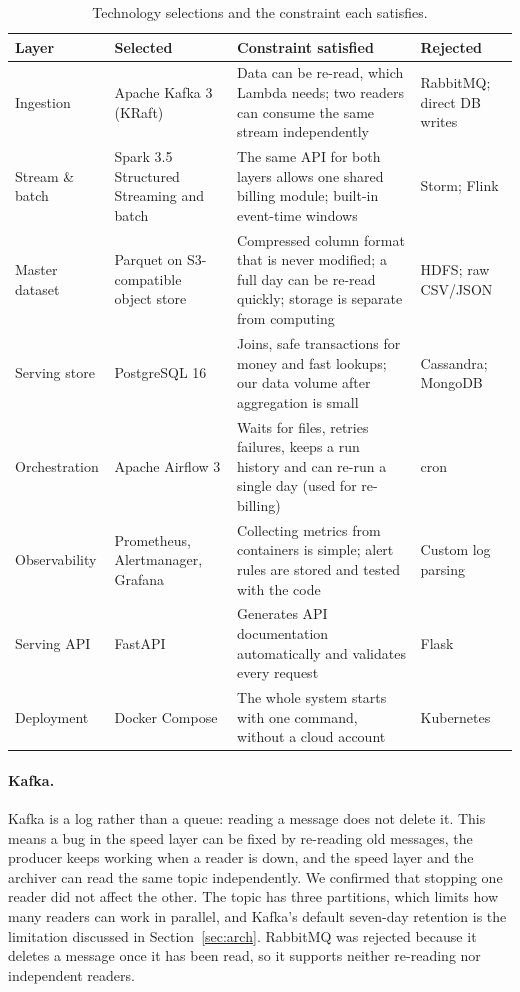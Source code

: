 \documentclass[11pt,a4paper]{article}
\begin{document}
\begin{table}[!htbp]
\centering
\caption{Technology selections and the constraint each satisfies.}
\label{tab:stack}
\small
\begin{tabularx}{\textwidth}{L{2.0cm} L{2.4cm} X L{2.2cm}}
\toprule
\textbf{Layer} & \textbf{Selected} & \textbf{Constraint satisfied} & \textbf{Rejected} \\
\midrule
Ingestion & Apache Kafka 3 (KRaft) & Data can be re-read, which Lambda needs; two readers can
consume the same stream independently & RabbitMQ; direct DB writes \\
\addlinespace
Stream \& batch & Spark 3.5 Structured Streaming and batch & The same API for both layers
allows one shared billing module; built-in event-time windows & Storm; Flink \\
\addlinespace
Master dataset & Parquet on S3-compatible object store & Compressed column format that is
never modified; a full day can be re-read quickly; storage is separate from computing &
HDFS; raw CSV/JSON \\
\addlinespace
Serving store & PostgreSQL 16 & Joins, safe transactions for money and fast lookups; our data
volume after aggregation is small & Cassandra; MongoDB \\
\addlinespace
Orchestration & Apache Airflow 3 & Waits for files, retries failures, keeps a run history and
can re-run a single day (used for re-billing) & cron \\
\addlinespace
Observability & Prometheus, Alertmanager, Grafana & Collecting metrics from containers is
simple; alert rules are stored and tested with the code & Custom log parsing \\
\addlinespace
Serving API & FastAPI & Generates API documentation automatically and validates every
request & Flask \\
\addlinespace
Deployment & Docker Compose & The whole system starts with one command, without a cloud
account & Kubernetes \\
\bottomrule
\end{tabularx}
\end{table}

\paragraph{Kafka.} Kafka \cite{kafka} is a log rather than a queue: reading a message does
not delete it. This means a bug in the speed layer can be fixed by re-reading old messages,
the producer keeps working when a reader is down, and the speed layer and the archiver can
read the same topic independently. We confirmed that stopping one reader did not affect the
other. The topic has three partitions, which limits how many readers can work in parallel,
and Kafka's default seven-day retention is the limitation discussed in
Section~\ref{sec:arch}. RabbitMQ was rejected because it deletes a message once it has been
read, so it supports neither re-reading nor independent readers.
\end{document}
